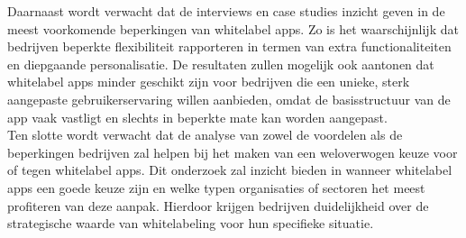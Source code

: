 Daarnaast wordt verwacht dat de interviews en case studies inzicht geven in de meest voorkomende beperkingen van whitelabel apps. 
Zo is het waarschijnlijk dat bedrijven beperkte flexibiliteit rapporteren in termen van extra functionaliteiten en diepgaande personalisatie. 
De resultaten zullen mogelijk ook aantonen dat whitelabel apps minder geschikt zijn voor bedrijven die een unieke, sterk aangepaste gebruikerservaring willen aanbieden, omdat de basisstructuur van de app vaak vastligt en slechts in beperkte mate kan worden aangepast.\\

Ten slotte wordt verwacht dat de analyse van zowel de voordelen als de beperkingen bedrijven zal helpen bij het maken van een weloverwogen keuze voor of tegen whitelabel apps. 
Dit onderzoek zal inzicht bieden in wanneer whitelabel apps een goede keuze zijn en welke typen organisaties of sectoren het meest profiteren van deze aanpak. 
Hierdoor krijgen bedrijven duidelijkheid over de strategische waarde van whitelabeling voor hun specifieke situatie.
